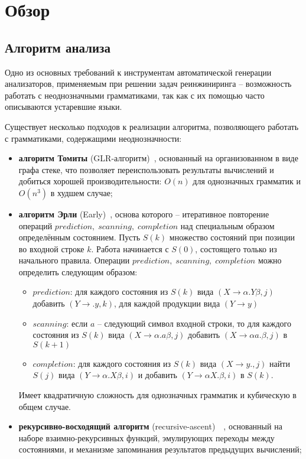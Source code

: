 \section{Обзор}


\subsection{Алгоритм анализа}

Одно из основных требований к инструментам автоматической генерации анализаторов, применяемым при решении задач реинжиниринга -- возможность работать с неоднозначными грамматиками, так как с их помощью часто описываются устаревшие языки.

Существует несколько подходов к реализации алгоритма, позволяющего работать с грамматиками, содержащими неоднозначности:
\begin{itemize}
  \item {\bfseries алгоритм Томиты} (GLR-алгоритм)~\cite{Practical Guide}, основанный на организованном в виде графа стеке, что позволяет переиспользовать результаты вычислений и добиться хорошей производительности: $O(n)$ для однозначных грамматик и $O(n^3)$  в худшем случае;
  \item {\bfseries алгоритм Эрли} (Early)~\cite{Practical Guide}, основа которого -- итеративное повторение операций $ prediction,\; scanning, \; completion$ над специальным образом определённым состоянием. Пусть $S(k)$ множество состояний при  позиции во входной строке $k$. Работа начинается с $S(0)$, состоящего только из начального правила. Операции  $ prediction,\; scanning, \; completion$ можно определить следующим образом:
\begin{itemize}
	\item $prediction$: для каждого состояния из $S(k)$ вида $(X \rightarrow \alpha.Y\beta , j)$ добавить $(Y \rightarrow .y,k)$, для каждой продукции вида $(Y \rightarrow y)$
	\item $scanning$: если $a$ -- следующий символ входной строки, то для каждого состояния из $S(k)$ вида $(X \rightarrow \alpha.a\beta , j)$ добавить $(X \rightarrow \alpha a.\beta,j)$ в $S(k+1)$
	\item $completion$: для каждого состояния из $S(k)$ вида $(X \rightarrow y., j)$ найти $S(j)$ вида $(Y \rightarrow \alpha. X \beta, i)$ и добавить $(Y \rightarrow \alpha X.\beta, i)$ в $S(k)$.
\end{itemize}
Имеет квадратичную сложность для однозначных грамматик и кубическую в общем случае.
  \item {\bfseries рекурсивно-восходящий алгоритм} (recursive-ascent)~\cite{RECURSIVE-ASCENT PARSING}~\cite{RecursiveAscentParsing}, основанный на наборе взаимно-рекурсивных функций, эмулирующих переходы между состояниями, и механизме запоминания результатов предыдущих вычислений;

\end{itemize}
